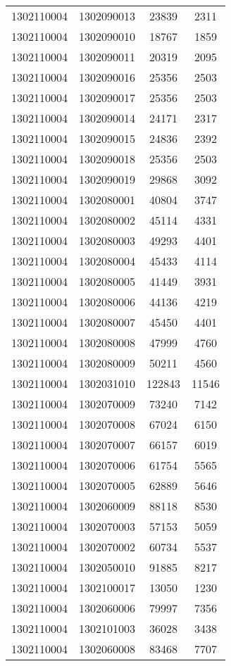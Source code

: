 \begin{longtable}[h]{llcc}
		1302110004 & 1302090013 & 23839 & 2311\\
		1302110004 & 1302090010 & 18767 & 1859\\
		1302110004 & 1302090011 & 20319 & 2095\\
		1302110004 & 1302090016 & 25356 & 2503\\
		1302110004 & 1302090017 & 25356 & 2503\\
		1302110004 & 1302090014 & 24171 & 2317\\
		1302110004 & 1302090015 & 24836 & 2392\\
		1302110004 & 1302090018 & 25356 & 2503\\
		1302110004 & 1302090019 & 29868 & 3092\\
		1302110004 & 1302080001 & 40804 & 3747\\
		1302110004 & 1302080002 & 45114 & 4331\\
		1302110004 & 1302080003 & 49293 & 4401\\
		1302110004 & 1302080004 & 45433 & 4114\\
		1302110004 & 1302080005 & 41449 & 3931\\
		1302110004 & 1302080006 & 44136 & 4219\\
		1302110004 & 1302080007 & 45450 & 4401\\
		1302110004 & 1302080008 & 47999 & 4760\\
		1302110004 & 1302080009 & 50211 & 4560\\
		1302110004 & 1302031010 & 122843 & 11546\\
		1302110004 & 1302070009 & 73240 & 7142\\
		1302110004 & 1302070008 & 67024 & 6150\\
		1302110004 & 1302070007 & 66157 & 6019\\
		1302110004 & 1302070006 & 61754 & 5565\\
		1302110004 & 1302070005 & 62889 & 5646\\
		1302110004 & 1302060009 & 88118 & 8530\\
		1302110004 & 1302070003 & 57153 & 5059\\
		1302110004 & 1302070002 & 60734 & 5537\\
		1302110004 & 1302050010 & 91885 & 8217\\
		1302110004 & 1302100017 & 13050 & 1230\\
		1302110004 & 1302060006 & 79997 & 7356\\
		1302110004 & 1302101003 & 36028 & 3438\\
		1302110004 & 1302060008 & 83468 & 7707\\

\end{longtable}
